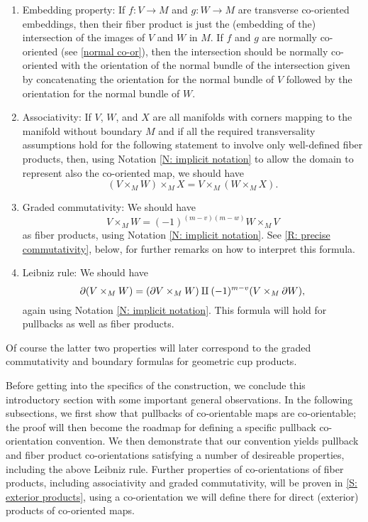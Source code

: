 \begin{enumerate}
	\item Embedding property: If $f \colon V \to M$ and $g \colon W \to M$ are transverse co-oriented embeddings, then their fiber product is just the (embedding of the) intersection of the images of $V$ and $W$ in $M$.
	If $f$ and $g$ are normally co-oriented (see \cref{normal co-or}), then the intersection should be normally co-oriented with the orientation of the normal bundle of the intersection given by concatenating the orientation for the normal bundle of $V$ followed by the orientation for the normal bundle of $W$.

	\item Associativity: If $V$, $W$, and $X$ are all manifolds with corners mapping to the manifold without boundary $M$ and if all the required transversality assumptions hold for the following statement to involve only well-defined fiber products, then, using Notation \ref{N: implicit notation} to allow the domain to represent also the co-oriented map, we should have
	$$(V \times_M W) \times_M X = V \times_M (W \times_M X).$$

	\item Graded commutativity: We should have
	$$V \times_M W = (-1)^{(m-v)(m-w)}W \times_M V$$
	as fiber products, using Notation \ref{N: implicit notation}.
	See \cref{R: precise commutativity}, below, for further remarks on how to interpret this formula.

	\item Leibniz rule: We should have
	$$\partial (V \times_M W) = (\partial V \times_M W)\amalg (-1)^{m-v}(V \times_M \partial W),$$
	 again using Notation \ref{N: implicit notation}.
	This formula will hold for pullbacks as well as fiber products.
\end{enumerate}
Of course the latter two properties will later correspond to the graded commutativity and boundary formulas for geometric cup products.

Before getting into the specifics of the construction, we conclude this introductory section with some important general observations.
In the following subsections, we first show that pullbacks of co-orientable maps are co-orientable; the proof will then become the roadmap for defining a specific pullback co-orientation convention.
We then demonstrate that our convention yields pullback and fiber product co-orientations satisfying a number of desireable properties, including the above Leibniz rule.
Further properties of co-orientations of fiber products, including associativity and graded commutativity, will be proven in \cref{S: exterior products}, using a co-orientation we will define there for direct (exterior) products of co-oriented maps.

